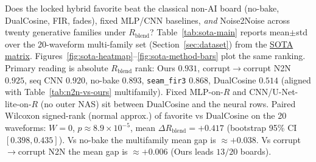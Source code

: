 Does the locked hybrid favorite beat the classical non-AI board (no-bake, DualCosine, FIR, fades),
fixed MLP/CNN baselines, \emph{and} Noise2Noise across twenty generative families under $R_{\mathrm{blend}}$?
Table~\ref{tab:sota-main} reports mean$\pm$std over the 20-waveform multi-family set (Section~\ref{sec:dataset}) from the \href{https://github.com/reeldemo/denoise-opt-meta/blob/master/paper/Unsupervised_Wavetable_Seam_Artifact_Repair_via_Hybrid_GA-PPO_Meta-Search_v11/figures/sota_matrix.json}{SOTA matrix}.
Figures~\ref{fig:sota-heatmap}--\ref{fig:sota-method-bars} plot the same ranking.
Primary reading is absolute $R_{\mathrm{blend}}$ rank:
Ours $0.931$, corrupt$\to$corrupt N2N $0.925$, seq CNN $0.920$, no-bake $0.893$,
\texttt{seam\_fir3} $0.868$, DualCosine $0.514$
(aligned with Table~\ref{tab:n2n-vs-ours} multifamily).
Fixed MLP-on-$R$ and CNN/U-Net-lite-on-$R$ (no outer NAS) sit between DualCosine and the neural rows.
Paired Wilcoxon signed-rank (normal approx.) of favorite vs DualCosine on the 20 waveforms: $W{=}0$, $p{\approx}8.9{\times}10^{-5}$, mean $\Delta R_{\mathrm{blend}}{=}{+}0.417$ (bootstrap 95\% CI $[0.398,0.435]$).
Vs no-bake the multifamily mean gap is $\approx{+}0.038$.
Vs corrupt$\to$corrupt N2N the mean gap is $\approx{+}0.006$ (Ours leads $13/20$ boards).

